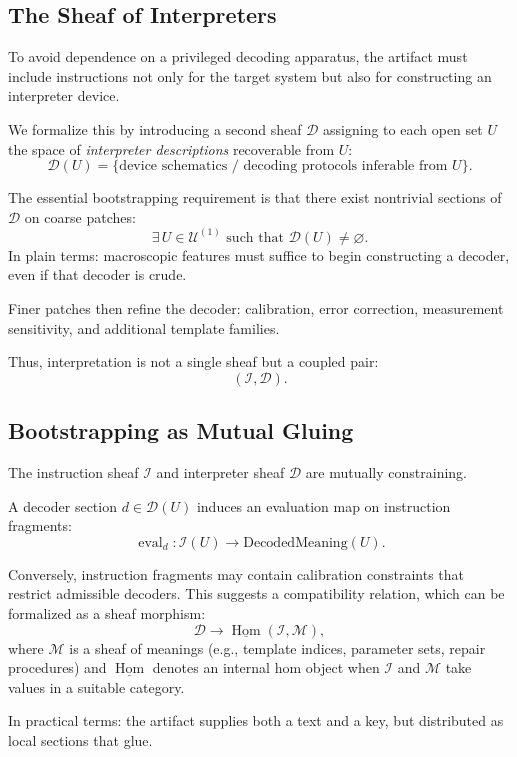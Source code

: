 \documentclass[11pt]{article}
\begin{document}
\subsection{The Sheaf of Interpreters}

To avoid dependence on a privileged decoding apparatus, the artifact
must include instructions not only for the target system but also for
constructing an interpreter device.

We formalize this by introducing a second sheaf $\mathscr{D}$ assigning
to each open set $U$ the space of \emph{interpreter descriptions}
recoverable from $U$:
\[
\mathscr{D}(U) = \{\text{device schematics / decoding protocols inferable from } U\}.
\]

The essential bootstrapping requirement is that there exist nontrivial
sections of $\mathscr{D}$ on coarse patches:
\[
\exists\, U \in \mathcal{U}^{(1)} \text{ such that } \mathscr{D}(U) \neq \varnothing.
\]
In plain terms: macroscopic features must suffice to begin constructing a
decoder, even if that decoder is crude.

Finer patches then refine the decoder: calibration, error correction,
measurement sensitivity, and additional template families.

Thus, interpretation is not a single sheaf but a coupled pair:
\[
(\mathscr{I}, \mathscr{D}).
\]

\subsection{Bootstrapping as Mutual Gluing}

The instruction sheaf $\mathscr{I}$ and interpreter sheaf $\mathscr{D}$
are mutually constraining.

A decoder section $d \in \mathscr{D}(U)$ induces an evaluation map on
instruction fragments:
\[
\operatorname{eval}_d : \mathscr{I}(U) \to \text{DecodedMeaning}(U).
\]

Conversely, instruction fragments may contain calibration constraints
that restrict admissible decoders. This suggests a compatibility
relation, which can be formalized as a sheaf morphism:
\[
\mathscr{D} \to \underline{\operatorname{Hom}}(\mathscr{I}, \mathscr{M}),
\]
where $\mathscr{M}$ is a sheaf of meanings (e.g., template indices,
parameter sets, repair procedures) and
$\underline{\operatorname{Hom}}$ denotes an internal hom object when
$\mathscr{I}$ and $\mathscr{M}$ take values in a suitable category.

In practical terms: the artifact supplies both a text and a key,
but distributed as local sections that glue.
\end{document}
